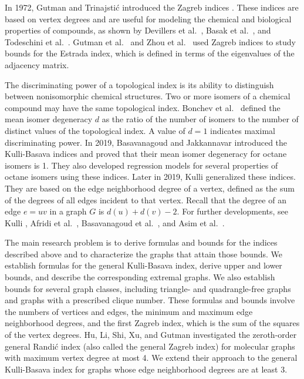 \documentclass[11pt, oneside]{amsart}   	%
\theoremstyle{definition}
\theoremstyle{remark}
\numberwithin{equation}{section}
\begin{document}
In 1972, Gutman and Trinajsti\'{c} introduced the Zagreb indices \cite{gutman1972graph}. These indices are based on vertex degrees and are useful for modeling the chemical and biological properties of compounds, as shown by Devillers et al.\ \cite{devillers1999topological}, Basak et al.\ \cite{basak1996estimation}, and Todeschini et al.\ \cite{todeschini2008handbook}. Gutman et al.\ \cite{gutman2007alkanes} and Zhou et al.\ \cite{zhou2008estrada} used Zagreb indices to study bounds for the Estrada index, which is defined in terms of the eigenvalues of the adjacency matrix.

The discriminating power of a topological index is its ability to distinguish between nonisomorphic chemical structures. Two or more isomers of a chemical compound may have the same topological index. Bonchev et al.\ \cite{bonchev1981isomer} defined the mean isomer degeneracy $d$ as the ratio of the number of isomers to the number of distinct values of the topological index. A value of $d=1$ indicates maximal discriminating power. In 2019, Basavanagoud and Jakkannavar \cite{basavanagoud2019kulli} introduced the Kulli-Basava indices and proved that their mean isomer degeneracy for octane isomers is 1. They also developed regression models for several properties of octane isomers using these indices. Later in 2019, Kulli \cite{VK2019} generalized these indices. They are based on the edge neighborhood degree of a vertex, defined as the sum of the degrees of all edges incident to that vertex. Recall that the degree of an edge $e=uv$ in a graph $G$ is $d(u)+d(v)-2$. For further developments, see Kulli \cite{VK2022}, Afridi et al.\ \cite{afridi2023sharp}, Basavanagoud et al.\ \cite{basavanagoud2024new}, and Asim et al.\ \cite{asim2025topological}.


The main research problem is to derive formulas and bounds for the indices described above and to characterize the graphs that attain those bounds. We establish formulas for the general Kulli-Basava index, derive upper and lower bounds, and describe the corresponding extremal graphs. We also establish bounds for several graph classes, including triangle- and quadrangle-free graphs and graphs with a prescribed clique number. These formulas and bounds involve the numbers of vertices and edges, the minimum and maximum edge neighborhood degrees, and the first Zagreb index, which is the sum of the squares of the vertex degrees. Hu, Li, Shi, Xu, and Gutman \cite{hu2005molecular} investigated the zeroth-order general Randi\'{c} index (also called the general Zagreb index) for molecular graphs with maximum vertex degree at most 4. We extend their approach to the general Kulli-Basava index for graphs whose edge neighborhood degrees are at least 3.
\end{document}
